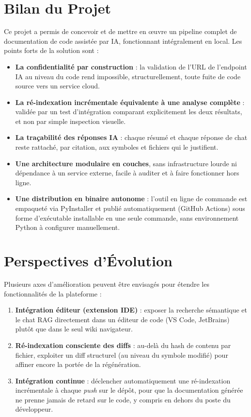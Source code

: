 \documentclass[12pt,a4paper]{report}
\begin{document}
\section{Bilan du Projet}
Ce projet a permis de concevoir et de mettre en œuvre un pipeline complet de
documentation de code assistée par IA, fonctionnant intégralement en local. Les
points forts de la solution sont :
\begin{itemize}
    \item \textbf{La confidentialité par construction} : la validation de l'URL de
    l'endpoint IA au niveau du code rend impossible, structurellement, toute fuite
    de code source vers un service cloud.
    \item \textbf{La ré-indexation incrémentale équivalente à une analyse
    complète} : validée par un test d'intégration comparant explicitement les deux
    résultats, et non par simple inspection visuelle.
    \item \textbf{La traçabilité des réponses IA} : chaque résumé et chaque réponse
    de chat reste rattaché, par citation, aux symboles et fichiers qui le
    justifient.
    \item \textbf{Une architecture modulaire en couches}, sans infrastructure
    lourde ni dépendance à un service externe, facile à auditer et à faire
    fonctionner hors ligne.
    \item \textbf{Une distribution en binaire autonome} : l'outil en ligne de
    commande est empaqueté via PyInstaller et publié automatiquement (GitHub
    Actions) sous forme d'exécutable installable en une seule commande, sans
    environnement Python à configurer manuellement.
\end{itemize}

\section{Perspectives d'Évolution}
Plusieurs axes d'amélioration peuvent être envisagés pour étendre les
fonctionnalités de la plateforme :
\begin{enumerate}
    \item \textbf{Intégration éditeur (extension IDE)} : exposer la recherche
    sémantique et le chat RAG directement dans un éditeur de code (VS Code, JetBrains)
    plutôt que dans le seul wiki navigateur.
    \item \textbf{Ré-indexation consciente des diffs} : au-delà du hash de contenu
    par fichier, exploiter un diff structurel (au niveau du symbole modifié) pour
    affiner encore la portée de la régénération.
    \item \textbf{Intégration continue} : déclencher automatiquement une
    ré-indexation incrémentale à chaque \textit{push} sur le dépôt, pour que la
    documentation générée ne prenne jamais de retard sur le code, y compris en
    dehors du poste du développeur.
\end{enumerate}
\end{document}
